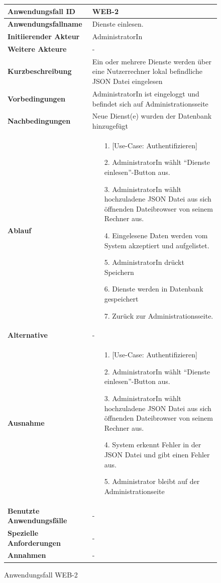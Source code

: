 \begin{figure}[h]
	\centering
	\begin{tabularx}{\textwidth}{ X | X }
		\textbf{Anwendungsfall ID} & WEB-2 \\ \hline
		\textbf{Anwendungsfallname} & Dienste einlesen. \\ \hline
		\textbf{Initiierender Akteur} & AdministratorIn \\ \hline
		\textbf{Weitere Akteure} & - \\ \hline
		\textbf{Kurzbeschreibung} & Ein oder mehrere Dienste werden über eine Nutzerrechner lokal befindliche JSON Datei eingelesen \\ \hline
		\textbf{Vorbedingungen} & AdministratorIn ist eingeloggt und befindet sich auf Administrationsseite \\ \hline
		\textbf{Nachbedingungen} & Neue Dienst(e) wurden der Datenbank hinzugefügt \\ \hline
		\textbf{Ablauf} &
		\begin{enumerate}
			\item [1.] [Use-Case: Authentifizieren]
			\item [2.] AdministratorIn wählt ``Dienste einlesen''-Button aus.
			\item [3.] AdministratorIn wählt hochzuladene JSON Datei aus sich öffnenden Dateibrowser von seinem Rechner aus.
			\item [4.] Eingelesene Daten werden vom System akzeptiert und aufgelistet.
			\item [5.] AdministratorIn drückt Speichern
			\item [6.] Dienste werden in Datenbank gespeichert
			\item [7.] Zurück zur Administrationsseite.
		\end{enumerate} \\ \hline
		\textbf{Alternative} & - \\ \hline
		\textbf{Ausnahme} &
		\begin{enumerate}
			\item [1.]  [Use-Case: Authentifizieren]
			\item [2.]  AdministratorIn wählt ``Dienste einlesen''-Button aus.
			\item [3.]  AdministratorIn wählt hochzuladene JSON Datei aus sich öffnenden Dateibrowser von seinem Rechner aus.
			\item [4.]  System erkennt Fehler in der JSON Datei und gibt einen Fehler aus.
			\item [5.]  Administrator bleibt auf der Administrationseite
		\end{enumerate}  \\ \hline
		\textbf{Benutzte Anwendungsfälle} & - \\ \hline
		\textbf{Spezielle Anforderungen} & - \\ \hline
		\textbf{Annahmen} & -
	\end{tabularx}
	\caption{Anwendungsfall WEB-2}
	\label{fig:anwendungsfall-server-tabelle-web-2}
\end{figure}

